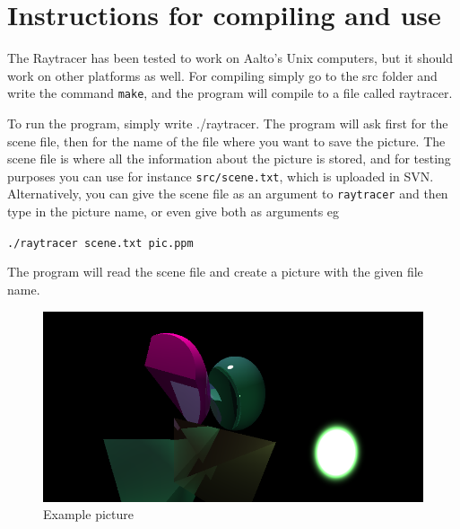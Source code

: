 
\section{Instructions for compiling and use}

	The Raytracer has been tested to work on Aalto's Unix computers, but it should work on other platforms as well. For compiling simply go to the src folder and write the command \texttt{make}, and the program will compile to a file called raytracer.

	To run the program, simply write ./raytracer. The program will ask first for the scene file, then for the name of the file where you want to save the picture. The scene file is where all the information about the picture is stored, and for testing purposes you can use for instance \texttt{src/scene.txt}, which is uploaded in SVN. Alternatively, you can give the scene file as an argument to \texttt{raytracer} and then type in the picture name, or even give both as arguments eg 
	
	\texttt{./raytracer scene.txt pic.ppm}

	The program will read the scene file and create a picture with the given file name.


	\begin{figure}
		\centering
		\includegraphics[width=\textwidth]{../img/pic.png}
		\caption{Example picture}
		\label{f:pic}
	\end{figure}